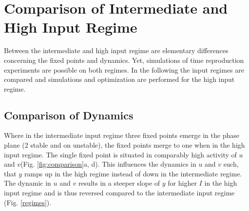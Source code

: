\documentclass[10pt]{article}
\begin{document}
\section{Comparison of Intermediate and High Input Regime}
Between the intermediate and high input regime are elementary differences concerning the fixed points and dynamics. Yet, simulations of time reproduction experiments are possible on both regimes. In the following the input regimes are compared and simulations and optimization are performed for the high input regime.

\subsection{Comparison of Dynamics}
Where in the intermediate input regime three fixed points emerge in the phase plane (2 stable and on unstable), the fixed points merge to one when in the high input regime. 
The single fixed point is situated in comparably high activity of $u$ and $v$(Fig. \ref{fig:comparison}a, d). 
This influences the dynamics in $u$ and $v$ such, that $y$ ramps up in the high regime instead of down in the intermediate regime. 
The dynamic in $u$ and $v$ results in a steeper slope of $y$ for higher $I$ in the high input regime and is thus reversed compared to the intermediate input regime (Fig. \ref{regimes}). 
\end{document}
